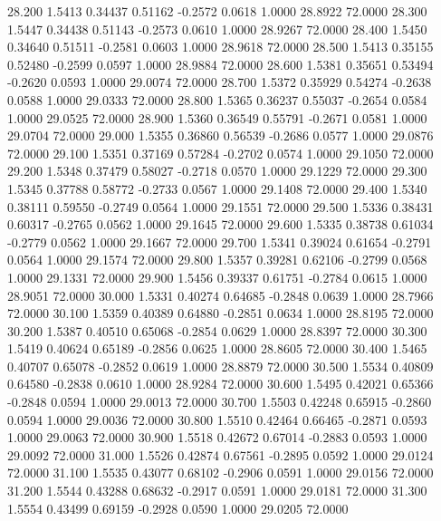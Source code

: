   28.200   1.5413   0.34437   0.51162  -0.2572   0.0618   1.0000  28.8922  72.0000
  28.300   1.5447   0.34438   0.51143  -0.2573   0.0610   1.0000  28.9267  72.0000
  28.400   1.5450   0.34640   0.51511  -0.2581   0.0603   1.0000  28.9618  72.0000
  28.500   1.5413   0.35155   0.52480  -0.2599   0.0597   1.0000  28.9884  72.0000
  28.600   1.5381   0.35651   0.53494  -0.2620   0.0593   1.0000  29.0074  72.0000
  28.700   1.5372   0.35929   0.54274  -0.2638   0.0588   1.0000  29.0333  72.0000
  28.800   1.5365   0.36237   0.55037  -0.2654   0.0584   1.0000  29.0525  72.0000
  28.900   1.5360   0.36549   0.55791  -0.2671   0.0581   1.0000  29.0704  72.0000
  29.000   1.5355   0.36860   0.56539  -0.2686   0.0577   1.0000  29.0876  72.0000
  29.100   1.5351   0.37169   0.57284  -0.2702   0.0574   1.0000  29.1050  72.0000
  29.200   1.5348   0.37479   0.58027  -0.2718   0.0570   1.0000  29.1229  72.0000
  29.300   1.5345   0.37788   0.58772  -0.2733   0.0567   1.0000  29.1408  72.0000
  29.400   1.5340   0.38111   0.59550  -0.2749   0.0564   1.0000  29.1551  72.0000
  29.500   1.5336   0.38431   0.60317  -0.2765   0.0562   1.0000  29.1645  72.0000
  29.600   1.5335   0.38738   0.61034  -0.2779   0.0562   1.0000  29.1667  72.0000
  29.700   1.5341   0.39024   0.61654  -0.2791   0.0564   1.0000  29.1574  72.0000
  29.800   1.5357   0.39281   0.62106  -0.2799   0.0568   1.0000  29.1331  72.0000
  29.900   1.5456   0.39337   0.61751  -0.2784   0.0615   1.0000  28.9051  72.0000
  30.000   1.5331   0.40274   0.64685  -0.2848   0.0639   1.0000  28.7966  72.0000
  30.100   1.5359   0.40389   0.64880  -0.2851   0.0634   1.0000  28.8195  72.0000
  30.200   1.5387   0.40510   0.65068  -0.2854   0.0629   1.0000  28.8397  72.0000
  30.300   1.5419   0.40624   0.65189  -0.2856   0.0625   1.0000  28.8605  72.0000
  30.400   1.5465   0.40707   0.65078  -0.2852   0.0619   1.0000  28.8879  72.0000
  30.500   1.5534   0.40809   0.64580  -0.2838   0.0610   1.0000  28.9284  72.0000
  30.600   1.5495   0.42021   0.65366  -0.2848   0.0594   1.0000  29.0013  72.0000
  30.700   1.5503   0.42248   0.65915  -0.2860   0.0594   1.0000  29.0036  72.0000
  30.800   1.5510   0.42464   0.66465  -0.2871   0.0593   1.0000  29.0063  72.0000
  30.900   1.5518   0.42672   0.67014  -0.2883   0.0593   1.0000  29.0092  72.0000
  31.000   1.5526   0.42874   0.67561  -0.2895   0.0592   1.0000  29.0124  72.0000
  31.100   1.5535   0.43077   0.68102  -0.2906   0.0591   1.0000  29.0156  72.0000
  31.200   1.5544   0.43288   0.68632  -0.2917   0.0591   1.0000  29.0181  72.0000
  31.300   1.5554   0.43499   0.69159  -0.2928   0.0590   1.0000  29.0205  72.0000
